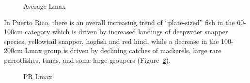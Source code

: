 \documentclass[
  letterpaper,
  oneside,
  open=any]{scrbook}
\begin{document}
\begin{figure}


\caption{\label{fig-avgLmax}Average Lmax}

\end{figure}%

In Puerto Rico, there is an overall increasing trend of ``plate-sized''
fish in the 60-100cm category which is driven by increased landings of
deepwater snapper species, yellowtail snapper, hogfish and red hind,
while a decrease in the 100-200cm Lmax group is driven by declining
catches of mackerels, large rare parrotfishes, tunas, and some large
groupers (Figure~\ref{fig-PRLmax}).

\begin{figure}


\caption{\label{fig-PRLmax}PR Lmax}

\end{figure}%
\end{document}
